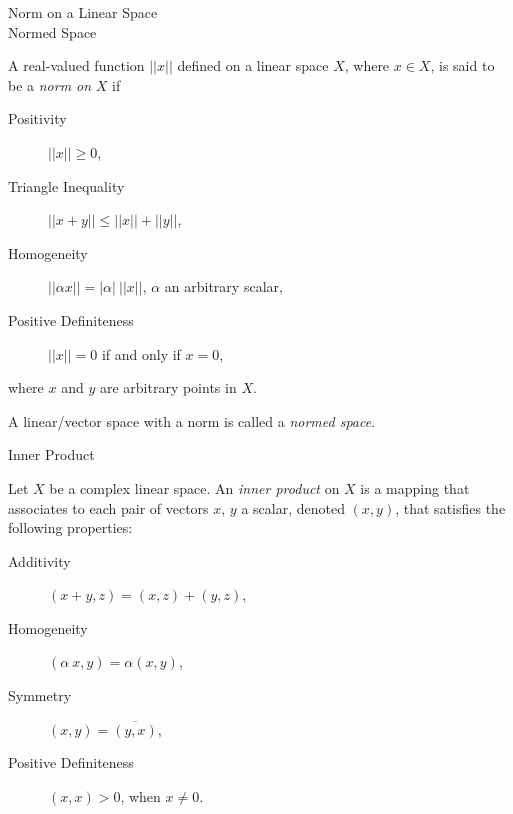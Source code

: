 
\begin{flashcard}[Definition]{Norm on a Linear Space \\ Normed Space}

  A real-valued function $||x||$ defined on a linear space $X$, where
  $x \in X$, is said to be a \emph{norm on} $X$ if

  \smallskip

  \begin{description}
    \item [Positivity]            $||x|| \geq 0$,
    \item [Triangle Inequality]   $||x+y|| \leq ||x|| + ||y||$,
    \item [Homogeneity]           $||\alpha x|| = |\alpha| \:  ||x||$,
                                  $\alpha$ an arbitrary scalar,
    \item [Positive Definiteness] $||x|| = 0$ if and only if $x=0$,
  \end{description}

  \smallskip

  where $x$ and $y$ are arbitrary points in $X$.

  \medskip

  A linear/vector space with a norm is called a \emph{normed space}.
\end{flashcard}

\begin{flashcard}[Definition]{Inner Product}

  Let $X$ be a complex linear space. An \emph{inner product} on $X$ is
  a mapping that associates to each pair of vectors $x$, $y$ a scalar,
  denoted $(x,y)$, that satisfies the following properties:

  \medskip

  \begin{description}
    \item [Additivity]            $(x+y,z) = (x,z) + (y,z)$,
    \item [Homogeneity]           $(\alpha \: x, y) = \alpha (x,y)$,
    \item [Symmetry]              $(x,y) = \overline{(y,x)}$,
    \item [Positive Definiteness] $(x,x) > 0$, when $x\neq0$.
  \end{description}
\end{flashcard}

